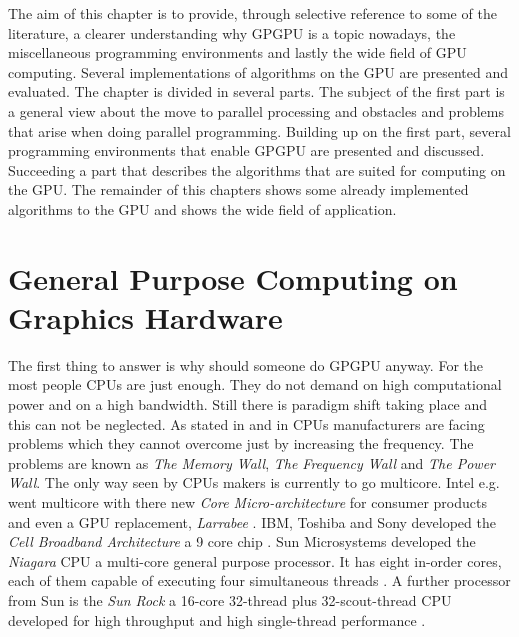 The aim of this chapter is to provide, through selective reference to some
of the literature, a clearer understanding why \gls{GPGPU} is a topic nowadays,
the miscellaneous programming environments and lastly the wide field of \gls{GPU}
computing. Several implementations of algorithms on the \gls{GPU} are presented
and evaluated. 
The chapter is divided in several parts. The subject of the first part is a
general view about the move to parallel processing and obstacles and problems
that arise when doing parallel programming. Building up on the first part,
several programming environments that enable \gls{GPGPU} are presented and
discussed. Succeeding a part that describes the algorithms that are suited for
computing on the \gls{GPU}. The remainder of this chapters shows some already
implemented algorithms to the \gls{GPU} and shows the wide field of application.




\section{General Purpose Computing on Graphics Hardware} %
\label{sec:gpgpu}

The first thing to answer is why should someone do \gls{GPGPU} anyway. For the
most people \glspl{CPU} are just enough. They do not demand on high
computational power and on a high bandwidth. Still there is paradigm shift
taking place and this can not be neglected. As stated in
\citep{citeulike:1187394} and in \citep{citeulike:3421647} \glspl{CPU}
manufacturers are facing problems which they cannot overcome just by increasing
the frequency. The problems are known as \emph{The Memory
Wall}\citep{citeulike:457955}, \emph{The Frequency Wall} and \emph{The Power
Wall}. The only way seen by \glspl{CPU} makers is currently to go multicore.
Intel e.g. went multicore with there new \emph{Core Micro-architecture} for
consumer products and even a \gls{GPU} replacement, \emph{Larrabee}
\citep{citeulike:3153758}. \Gls{IBM}, Toshiba and Sony developed the \emph{Cell
Broadband Architecture} a 9 core chip \citep{citeulike:1243173}. Sun Microsystems
developed the \emph{Niagara} \gls{CPU} a multi-core general purpose processor. 
It has eight in-order cores, each of them capable of executing four simultaneous threads
\citep{citeulike:3743958}. A further processor from Sun is the \emph{Sun Rock} a
16-core 32-thread plus 32-scout-thread \gls{CPU} developed for high throughput
and high single-thread performance \citep{citeulike:6643579}.

